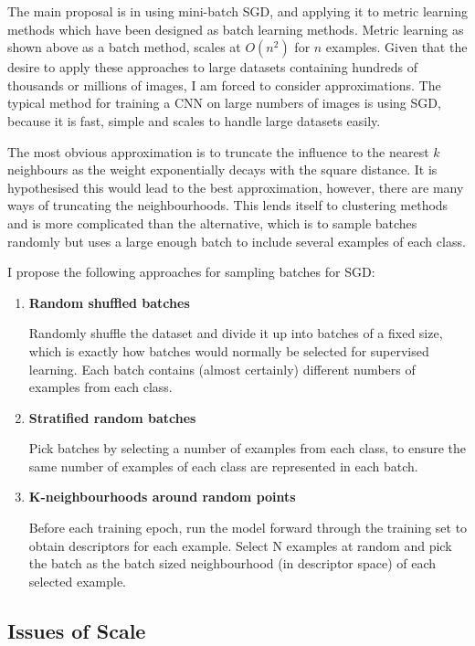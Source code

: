 The main proposal is in using mini-batch \gls{SGD}, and applying it to metric learning methods which have been designed as batch learning methods. Metric learning as shown above as a batch method, scales at $ O(n^2) $ for $ n $ examples. Given that the desire to apply these approaches to large datasets containing hundreds of thousands or millions of images, I am forced to consider approximations. The typical method for training a \gls{CNN} on large numbers of images is using \gls{SGD}, because it is fast, simple and scales to handle large datasets easily. 

The most obvious approximation is to truncate the influence to the nearest $ k $ neighbours as the weight exponentially decays with the square distance. It is hypothesised this would lead to the best approximation, however, there are many ways of truncating the neighbourhoods. This lends itself to clustering methods and is more complicated than the alternative, which is to sample batches randomly but uses a large enough batch to include several examples of each class.

I propose the following approaches for sampling batches for \gls{SGD}:

\begin{enumerate}
\item {\bf Random shuffled batches} \par
 Randomly shuffle the dataset and divide it up into batches of a fixed size, which is exactly how batches would normally be selected for supervised learning. Each batch contains (almost certainly) different numbers of examples from each class.
 \item {\bf Stratified random batches}  \par
 Pick batches by selecting a number of examples from each class, to ensure the same number of examples of each class are represented in each batch.   
 \item {\bf K-neighbourhoods around random points}  \par
 Before each training epoch, run the model forward through the training set to obtain descriptors for each example. Select N examples at random and pick the batch as the batch sized neighbourhood (in descriptor space) of each selected example.
\end {enumerate}


\subsection {Issues of Scale}

